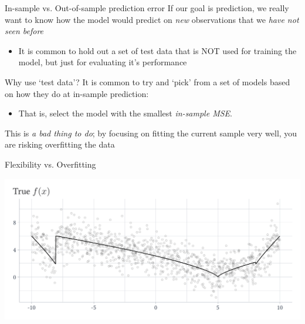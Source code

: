 \documentclass[aspectratio=169,t,11pt,table]{beamer}
\begin{document}
\begin{frame}{In-sample vs. Out-of-sample prediction error}
  If our goal is prediction, we really want to know how the model would predict on \emph{new} observations that we \emph{have not seen before}
  \begin{itemize}
    \item It is common to hold out a set of \alert{test data} that is NOT used for training the model, but just for evaluating it's performance
  \end{itemize}
\end{frame}

\begin{frame}{Why use `test data'?}
  It is common to try and `pick' from a set of models based on how they do at in-sample prediction:
  \begin{itemize}
    \item That is, select the model with the smallest \emph{in-sample MSE}. 
  \end{itemize}

  \pause
  \bigskip
  This is \emph{a bad thing to do}; by focusing on fitting the current sample very well, you are risking \alert{overfitting} the data
\end{frame}

\begin{frame}{Flexibility vs. Overfitting}
  \vspace{-\bigskipamount}
  \begin{center}
    \includegraphics[width = \textwidth]{figures/f_examples_plot_dgp.pdf}
  \end{center}
\end{frame}
\end{document}
